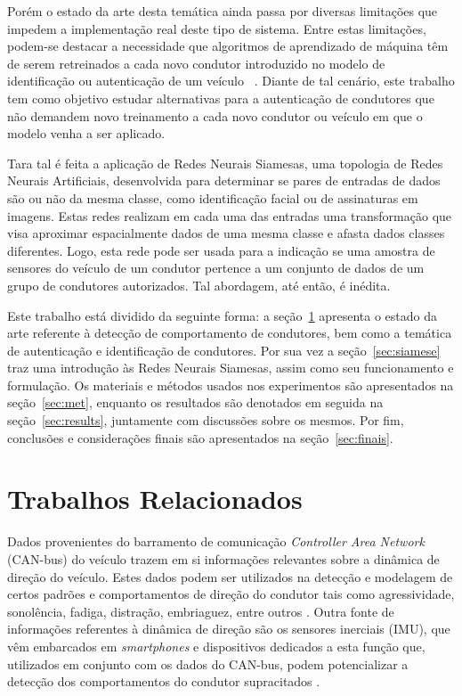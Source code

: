\documentclass[conference,harvard,brazil,english]{sbatex}
\begin{document}
Porém o estado da arte desta temática ainda passa por diversas limitações que impedem a implementação real deste tipo de sistema. Entre estas limitações, podem-se destacar a necessidade que algoritmos de aprendizado de máquina têm de serem retreinados a cada novo condutor introduzido no modelo de identificação ou autenticação de um veículo ~\cite{Wang2017a,Burton2017,Martinez2016a,Ezzini2018}. Diante de tal cenário, este trabalho tem como objetivo estudar alternativas para a autenticação de condutores que não demandem novo treinamento a cada novo condutor ou veículo em que o modelo venha a ser aplicado.

Tara tal é feita a aplicação de Redes Neurais Siamesas, uma topologia de Redes Neurais Artificiais, desenvolvida para determinar se pares de entradas de dados são ou não da mesma classe, como identificação facial ou de assinaturas em imagens. Estas redes realizam em cada uma das entradas uma transformação que visa aproximar espacialmente dados de uma mesma classe e afasta dados classes diferentes. Logo, esta rede pode ser usada para a indicação se uma amostra de sensores do veículo de um condutor pertence a um conjunto de dados de um grupo de condutores autorizados. Tal abordagem, até então, é inédita.

Este trabalho está dividido da seguinte forma: a seção~\ref{sec:trab_rel} apresenta o estado da arte referente à detecção de comportamento de condutores, bem como a temática de autenticação e identificação de condutores. Por sua vez a seção~\ref{sec:siamese} traz uma introdução às Redes Neurais Siamesas, assim como seu funcionamento e formulação. Os materiais e métodos usados nos experimentos são apresentados na seção~\ref{sec:met}, enquanto os resultados são denotados em seguida na seção~\ref{sec:results}, juntamente com discussões sobre os mesmos. Por fim, conclusões e considerações finais são apresentados na seção~\ref{sec:finais}.


\section{Trabalhos Relacionados} \label{sec:trab_rel}

Dados provenientes do barramento de comunicação \textit{Controller Area Network} (CAN-bus) do veículo trazem em si informações relevantes sobre a dinâmica de direção do veículo. Estes dados podem ser utilizados na detecção e modelagem de certos padrões e comportamentos de direção do condutor tais como agressividade, sonolência, fadiga, distração, embriaguez, entre outros \cite{Meiring2015}. Outra fonte de informações referentes à dinâmica de direção são os sensores inerciais (IMU), que vêm embarcados em \textit{smartphones} e dispositivos dedicados a esta função que, utilizados em conjunto com os dados do CAN-bus, podem potencializar a detecção dos comportamentos do condutor supracitados \cite{Kaplan2015}.
\end{document}
